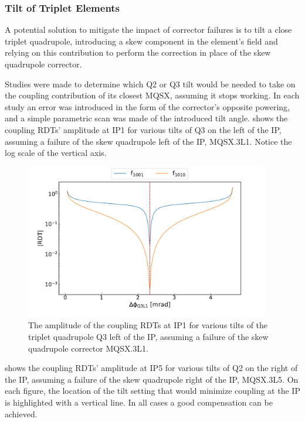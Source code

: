 \subsubsection*{Tilt of Triplet Elements}

A potential solution to mitigate the impact of corrector failures is to tilt a close triplet quadrupole, introducing a skew component in the element's field and relying on this contribution to perform the correction in place of the skew quadrupole corrector.

Studies were made to determine which Q\num{2} or Q\num{3} tilt would be needed to take on the coupling contribution of its closest MQSX, assuming it stops working.
In each study an error was introduced in the form of the corrector's opposite powering, and a simple parametric scan was made of the introduced tilt angle.
 shows the coupling RDTs' amplitude at IP\num{1} for various tilts of Q\num{3} on the left of the IP, assuming a failure of the skew quadrupole left of the IP, MQSX.\num{3}L\num{1}.
Notice the log scale of the vertical axis.

\begin{figure}[!htb]
    \centering
    \includegraphics*[width=0.95\textwidth]{Figures/IR_Coupling_Correction/ir1_compensate_left_with_q3.pdf}
    \caption{The amplitude of the coupling RDTs at IP\num{1} for various tilts of the triplet quadrupole Q\num{3} left of the IP, assuming a failure of the skew quadrupole corrector MQSX.\num{3}L\num{1}.}
    \label{figure:ir1_compensate_left_with_q3}
\end{figure}

 shows the coupling RDTs' amplitude at IP\num{5} for various tilts of Q\num{2} on the right of the IP, assuming a failure of the skew quadrupole right of the IP, MQSX.\num{3}L\num{5}.
On each figure, the location of the tilt setting that would minimize coupling at the IP is highlighted with a vertical line.
In all cases a good compensation can be achieved.

